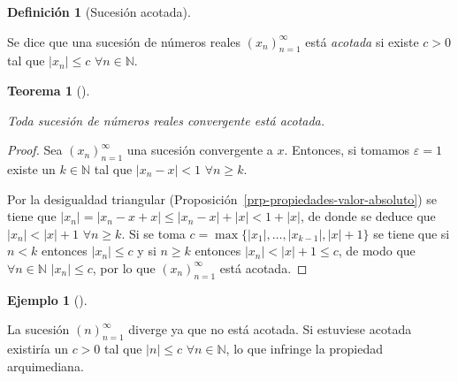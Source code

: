 \documentclass[
  a4paper,
]{scrreport}
\theoremstyle{definition}
\newtheorem{example}{Ejemplo}[chapter]
\theoremstyle{plain}
\theoremstyle{definition}
\newtheorem{definition}{Definición}[chapter]
\theoremstyle{plain}
\newtheorem{theorem}{Teorema}[chapter]
\theoremstyle{plain}
\theoremstyle{remark}
\begin{document}
\leavevmode{}%
\begin{definition}[Sucesión acotada]\label{def-sucesion-acotada}

Se dice que una sucesión de números reales \((x_n)_{n=1}^\infty\) está
\emph{acotada} si existe \(c>0\) tal que \(|x_n|\leq c\)
\(\forall n\in\mathbb{N}\).

\end{definition}

\leavevmode{}%
\begin{theorem}[]\label{thm-convergencia-sucesion-acotada}

Toda sucesión de números reales convergente está acotada.

\end{theorem}

\begin{tcolorbox}[enhanced jigsaw, breakable, arc=.35mm, colbacktitle=quarto-callout-note-color!10!white, toptitle=1mm, opacityback=0, colframe=quarto-callout-note-color-frame, colback=white, left=2mm, bottomrule=.15mm, opacitybacktitle=0.6, title=\textcolor{quarto-callout-note-color}{\faInfo}\hspace{0.5em}{Demostración}, toprule=.15mm, titlerule=0mm, coltitle=black, rightrule=.15mm, bottomtitle=1mm, leftrule=.75mm]

\begin{proof}

Sea \((x_n)_{n=1}^\infty\) una sucesión convergente a \(x\). Entonces,
si tomamos \(\varepsilon=1\) existe un \(k\in\mathbb{N}\) tal que
\(|x_n-x|<1\) \(\forall n\geq k\).

Por la desigualdad triangular
(Proposición~\ref{prp-propiedades-valor-absoluto}) se tiene que
\(|x_n|=|x_n-x+x|\leq |x_n-x|+|x|<1 + |x|\), de donde se deduce que
\(|x_n|<|x|+1\) \(\forall n\geq k\). Si se toma
\(c=\max\{|x_1|,\ldots, |x_{k-1}|, |x|+1\}\) se tiene que si \(n<k\)
entonces \(|x_n|\leq c\) y si \(n\geq k\) entonces
\(|x_n| <|x|+1\leq c\), de modo que \(\forall n\in\mathbb{N}\)
\(|x_n|\leq c\), por lo que \((x_n)_{n=1}^\infty\) está acotada.

\end{proof}

\end{tcolorbox}

\leavevmode{}%
\begin{example}[]\label{exm-sucesion-acotada}

La sucesión \((n)_{n=1}^\infty\) diverge ya que no está acotada. Si
estuviese acotada existiría un \(c>0\) tal que \(|n|\leq c\)
\(\forall n\in\mathbb{N}\), lo que infringe la propiedad arquimediana.

\end{example}
\end{document}
